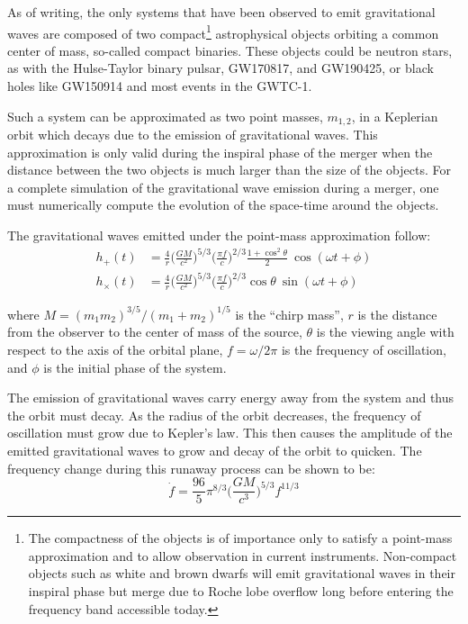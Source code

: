 \documentclass [12pt, proquest]{uwthesis}[2019]
\begin{document}
As of writing, the only systems that have been observed to emit gravitational waves are composed of two compact\footnote{The compactness of the objects is of importance only to satisfy a point-mass approximation and to allow observation in current instruments. Non-compact objects such as white and brown dwarfs will emit gravitational waves in their inspiral phase but merge due to Roche lobe overflow long before entering the frequency band accessible today.} astrophysical objects orbiting a common center of mass, so-called compact binaries. These objects could be neutron stars, as with the Hulse-Taylor binary pulsar\cite{hulseTaylor}, GW170817\cite{GW170817}, and GW190425\cite{GW190425}, or black holes like GW150914\cite{GW150914} and most events in the GWTC-1\cite{GWTC}.

Such a system can be approximated as two point masses, $m_{1,2}$, in a Keplerian orbit which decays due to the emission of gravitational waves. This approximation is only valid during the inspiral phase of the merger when the distance between the two objects is much larger than the size of the objects. For a complete simulation of the gravitational wave emission during a merger, one must numerically compute the evolution of the space-time around the objects.~\cite{NGR}

The gravitational waves emitted under the point-mass approximation follow:
\begin{align}
h_+(t)&=\frac{4}{r}\bigg(\frac{GM}{c^2}\bigg)^{5/3} \bigg( \frac{\pi f}{c} \bigg)^{2/3} \frac{1+\cos^2\theta}{2} \ \cos(\omega t + \phi)\\
h_\times(t)&=\frac{4}{r}\bigg(\frac{GM}{c^2}\bigg)^{5/3} \bigg( \frac{\pi f}{c} \bigg)^{2/3} \cos\theta\ \sin(\omega t + \phi)
\end{align}

where $M=(m_1 m_2)^{3/5}/(m_1+m_2)^{1/5}$ is the ``chirp mass'', $r$ is the distance from the observer to the center of mass of the source, $\theta$ is the viewing angle with respect to the axis of the orbital plane, $f=\omega/2\pi$ is the frequency of oscillation, and $\phi$ is the initial phase of the system.

The emission of gravitational waves carry energy away from the system and thus the orbit must decay. As the radius of the orbit decreases, the frequency of oscillation must grow due to Kepler's law. This then causes the amplitude of the emitted gravitational waves to grow and decay of the orbit to quicken. The frequency change during this runaway process can be shown to be:
\begin{equation}
\dot{f}=\frac{96}{5}\pi^{8/3}\bigg(\frac{G M}{c^3}\bigg)^{5/3} f^{11/3}
\end{equation}
\end{document}
